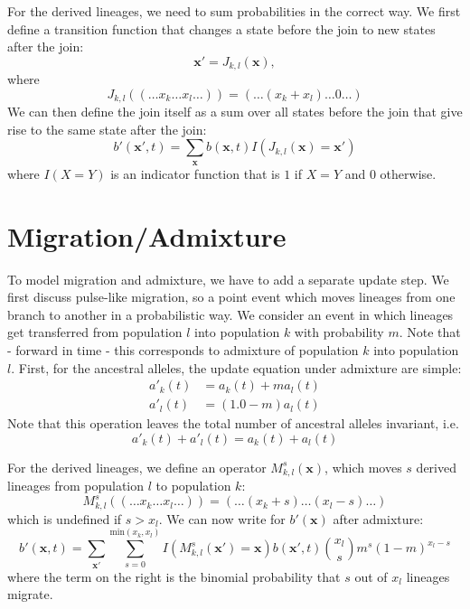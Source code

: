\documentclass[a4paper]{article}
\begin{document}
For the derived lineages, we need to sum probabilities in the correct way. We first define a transition function that changes a state before the join to new states after the join:
\begin{equation}
    \mathbf{x}' = J_{k,l}(\mathbf{x}),
\end{equation} 
where
\begin{equation}
    J_{k,l}((\ldots x_k \ldots x_l \ldots)) = (\ldots (x_k + x_l) \ldots 0 \ldots)
\end{equation}
We can then define the join itself as a sum over all states before the join that give rise to the same state after the join:
\begin{equation}
    b'(\mathbf{x}',t) = \sum_{\mathbf{x}} b(\mathbf{x},t) I(J_{k,l}(\mathbf{x})=\mathbf{x}')
\end{equation}
where $I(X=Y)$ is an indicator function that is $1$ if $X=Y$ and $0$ otherwise.
 
\section{Migration/Admixture}
To model migration and admixture, we have to add a separate update step. We first discuss pulse-like migration, so a point event which moves lineages from one branch to another in a probabilistic way. We consider an event in which lineages get transferred from population $l$ into population $k$ with probability $m$. Note that - forward in time - this corresponds to admixture of population $k$ into population $l$. First, for the ancestral alleles, the update equation under admixture are simple: 
\begin{align}
    a'_k(t) &= a_k(t) + m a_l(t)\\
    a'_l(t) &= (1.0 - m)a_l(t)
\end{align}
Note that this operation leaves the total number of ancestral alleles invariant, i.e.
\begin{equation}
    a'_k(t) + a'_l(t) = a_k(t) + a_l(t)
\end{equation}

For the derived lineages, we define an operator $M_{k,l}^s(\mathbf{x})$, which moves $s$ derived lineages from population $l$ to population $k$:
\begin{equation}
    M_{k,l}^s((\ldots x_k \ldots x_l \ldots)) = (\ldots (x_k + s) \ldots (x_l - s) \ldots)
\end{equation}
which is undefined if $s>x_l$. We can now write for $b'(\mathbf{x})$ after admixture:
\begin{equation}
    b'(\mathbf{x},t) = \sum_{\mathbf{x'}}\sum_{s=0}^{\mathrm{min}(x_k,x_l)} I(M_{k,l}^s(\mathbf{x'})=\mathbf{x})
    b(\mathbf{x'},t) \binom{x_l}{s} m^s(1-m)^{x_l-s} 
\end{equation}
where the term on the right is the binomial probability that $s$ out of $x_l$ lineages migrate.
\end{document}
